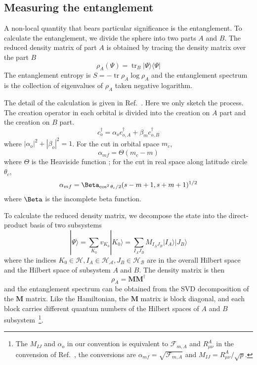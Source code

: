 \documentclass{timesjhep}
\begin{document}
\subsection{Measuring the entanglement}
\label{sec:ed_ent}

A non-local quantity that bears particular significance is the entanglement. To calculate the entanglement, we divide the sphere into two parts $A$ and $B$. The reduced density matrix of part $A$ is obtained by tracing the density matrix over the part $B$
\begin{equation}
    \rho_A(\Psi)=\operatorname{tr}_B|\Psi\rangle\langle\Psi|
\end{equation}
The entanglement entropy is $S=-\operatorname{tr}\rho_A\log\rho_A$ and the entanglement spectrum is the collection of eigenvalues of $\rho_A$ taken negative logarithm. 

The detail of the calculation is given in Ref.~\cite{Sterdyniak2011RealEnt}. Here we only sketch the process. The creation operator in each orbital is divided into the creation on $A$ part and the creation on $B$ part. 
\begin{equation}
    c^\dagger_o=\alpha_oc^\dagger_{o,A}+\beta_mc^\dagger_{o,B}
\end{equation}
where $|\alpha_o|^2+|\beta_o|^2=1$. For the cut in orbital space $m_c$, 
\begin{equation*}
    \alpha_{mf}=\Theta(m_c-m)
\end{equation*}
where $\Theta$ is the Heaviside function ; for the cut in real space along latitude circle $\theta_c$,
\begin{equation*}
    \alpha_{mf}=\Beta_{\cos^2\theta_c/2}(s-m+1,s+m+1)^{1/2}
\end{equation*}
where $\Beta$ is the incomplete beta function. 

To calculate the reduced density matrix, we decompose the state into the direct-product basis of two subsystems
\begin{equation}
    |\Psi\rangle=\sum_{K_0}v_{K_0}|K_0\rangle=\sum_{I_AJ_B}M_{I_AJ_B}|I_A\rangle|J_B\rangle
\end{equation}
where the indices $K_0\in\mathcal{H},I_A\in\mathscr{H_A},J_B\in\mathscr{H_B}$ are in the overall Hilbert space and the Hilbert space of subsystem $A$ and $B$. The density matrix is then 
\begin{equation}
    \rho_A=\mathbf{M}\mathbf{M}^\dagger
\end{equation}
and the entanglement spectrum can be obtained from the SVD decomposition of the $\mathbf{M}$ matrix. Like the Hamiltonian, the $\mathbf{M}$ matrix is block diagonal, and each block carries different quantum numbers of the Hilbert spaces of $A$ and $B$ subsystem~\footnote{The $M_{IJ}$ and $\alpha_o$ in our convention is equivalent to $\mathcal{F}_{m,A}$ and $R_{\mu\nu}^A$ in the convension of Ref.~\cite{Sterdyniak2011RealEnt}, the conversions are $\alpha_{mf}=\sqrt{\mathscr{F}_{m,A}}$ and $M_{IJ}=R_{\mu\nu}^A/\sqrt{p}$.}. 
\end{document}

